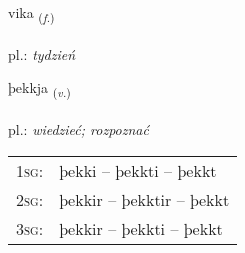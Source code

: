\documentclass[frontgrid, backgrid]{flacards}\usepackage[]{graphicx}\usepackage[]{xcolor}
\begin{document}
\renewcommand{\flhead}{\vskip5pt \fboxsep=0pt {\small\bfseries\footnotesize Nafnorð | rzeczownik}}
\renewcommand{\fcfoot}{\vskip5pt \fboxsep=0pt \hspace{2pt}{\small\bfseries\footnotesize 1K}}

\renewcommand{\blhead}{\vskip5pt {\small\bfseries\footnotesize Nafnorð | rzeczownik }}
\renewcommand{\bcfoot}{\vskip5pt \hspace{2pt}{\small\bfseries\footnotesize 1K}}


{vika \small{\textsubscript{(\textit{f.})}} \\[1ex] %
\textphonetic{[vɪːka]} \\
pl.: \emph{tydzień} \\  [2ex]
\renewcommand*{\arraystretch}{0.8}
}

\renewcommand{\flhead}{\vskip5pt \fboxsep=0pt {\small\bfseries\footnotesize Sagnorð | czasownik}}
\renewcommand{\fcfoot}{\vskip5pt \fboxsep=0pt \hspace{2pt}{\small\bfseries\footnotesize 1K}}

\renewcommand{\blhead}{\vskip5pt {\small\bfseries\footnotesize Sagnorð | czasownik }}
\renewcommand{\bcfoot}{\vskip5pt \hspace{2pt}{\small\bfseries\footnotesize 1K}}


{þekkja \small{\textsubscript{(\textit{v.})}} \\[1ex] %
\textphonetic{[θɛhca]} \\
pl.: \emph{wiedzieć; rozpoznać} \\  [2ex]
\renewcommand*{\arraystretch}{0.8}
\begin{tabular}{p{1cm}l}
\textsc{1sg}: & þekki -- þekkti -- þekkt \\ 
\textsc{2sg}: & þekkir -- þekktir -- þekkt \\ 
\textsc{3sg}: & þekkir -- þekkti -- þekkt \\ 
\end{tabular}
}
\end{document}
